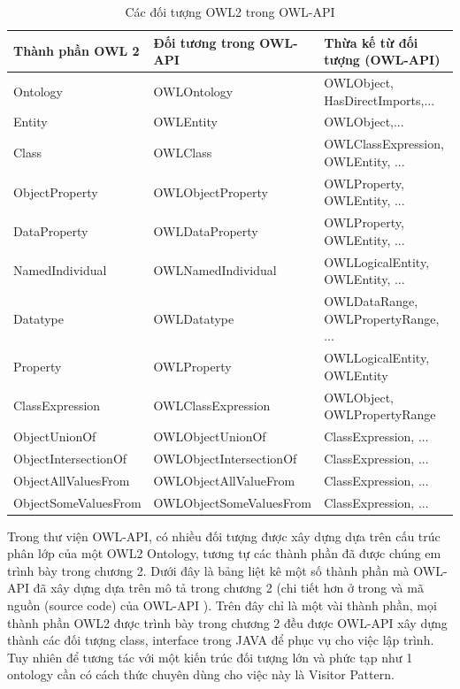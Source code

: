 \begin{table}[h]
	\centering
	\begin{tabular}{|l|l|p{4cm}|}
		\hline
		Thành phần OWL 2 		& Đối tương trong OWL-API 		& Thừa kế từ đối tượng (OWL-API) \\
		\hline
		Ontology 				& OWLOntology 					& OWLObject, HasDirectImports,...  \\ 
		\hline
		Entity 					& OWLEntity 					& OWLObject,...  \\
		\hline
		Class 					& OWLClass 						& OWLClassExpression, OWLEntity, ...   \\		
		\hline
		ObjectProperty 			& OWLObjectProperty 			& OWLProperty, OWLEntity, ...   \\		
		\hline
		DataProperty 			& OWLDataProperty 				& OWLProperty, OWLEntity, ...   \\
		\hline
		NamedIndividual 		& OWLNamedIndividual			& OWLLogicalEntity, OWLEntity, ...  \\
		\hline
		Datatype 				& OWLDatatype 					& OWLDataRange, OWLPropertyRange, ...   \\
		\hline
		Property 				& OWLProperty 					& OWLLogicalEntity, OWLEntity   \\
		\hline
		ClassExpression			& OWLClassExpression			& OWLObject, OWLPropertyRange   \\
		\hline
		ObjectUnionOf			& OWLObjectUnionOf				& ClassExpression, ...\\
		\hline
		ObjectIntersectionOf	& OWLObjectIntersectionOf		& ClassExpression, ... \\
		\hline
		ObjectAllValuesFrom		& OWLObjectAllValueFrom		& ClassExpression, ... \\
		\hline
		ObjectSomeValuesFrom	& OWLObjectSomeValuesFrom		& ClassExpression, ... \\
		\hline
	\end{tabular}
	\caption{Các đối tượng OWL2 trong OWL-API\label{overflow}}
\end{table}
Trong thư viện OWL-API, có nhiều đối tượng được xây dựng dựa trên cấu trúc phân lớp của một OWL2 Ontology, tương tự các thành phần đã được chúng em trình bày trong chương 2. Dưới đây là bảng liệt kê một số thành phần mà OWL-API đã xây dựng dựa trên mô tả trong chương 2 (chi tiết hơn ở trong \cite{owl2spec} và mã nguồn (source code) của OWL-API \cite{owlapi}). Trên đây chỉ là một vài thành phần, mọi thành phần OWL2 được trình bày trong chương 2 đều được OWL-API xây dựng thành các đối tượng class, interface trong JAVA để phục vụ cho việc lập trình. Tuy nhiên để tương tác với một kiến trúc đối tượng lớn và phức tạp như 1 ontology cần có cách thức chuyên dùng cho việc này là Visitor Pattern.
